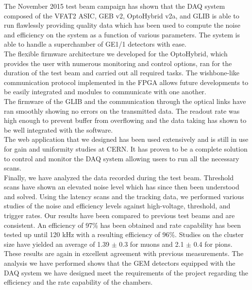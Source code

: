     The November 2015 test beam campaign has shown that the DAQ system composed of the VFAT2 ASIC, GEB v2, OptoHybrid v2a, and GLIB is able to run flawlessly providing quality data which has been used to compute the noise and efficiency on the system as a function of various parameters. The system is able to handle a superchamber of GE1/1 detectors with ease. \\

    The flexible firmware architecture we developed for the OptoHybrid, which provides the user with numerous monitoring and control options, ran for the duration of the test beam and carried out all required tasks. The wishbone-like communication protocol implemented in the FPGA allows future developments to be easily integrated and modules to communicate with one another. \\

    The firmware of the GLIB and the communication through the optical links have ran smoothly showing no errors on the transmitted data. The readout rate was high enough to prevent buffer from overflowing and the data taking has shown to be well integrated with the software. \\

    The web application that we designed has been used extensively and is still in use for gain and uniformity studies at CERN. It has proven to be a complete solution to control and monitor the DAQ system allowing users to run all the necessary scans. \\

    Finally, we have analyzed the data recorded during the test beam. Threshold scans have shown an elevated noise level which has since then been understood and solved. Using the latency scans and the tracking data, we performed various studies of the noise and efficiency levels against high-voltage, threshold, and trigger rates. Our results have been compared to previous test beams and are consistent. An efficiency of 97\% has been obtained and rate capability has been tested up until 120 kHz with a resulting efficiency of 96\%. Studies on the cluster size have yielded an average of 1.39 $\pm$ 0.3 for muons and 2.1 $\pm$ 0.4 for pions. These results are again in excellent agreement with previous measurements. The analysis we have performed shows that the GEM detectors equipped with the DAQ system we have designed meet the requirements of the project regarding the efficiency and the rate capability of the chambers.
